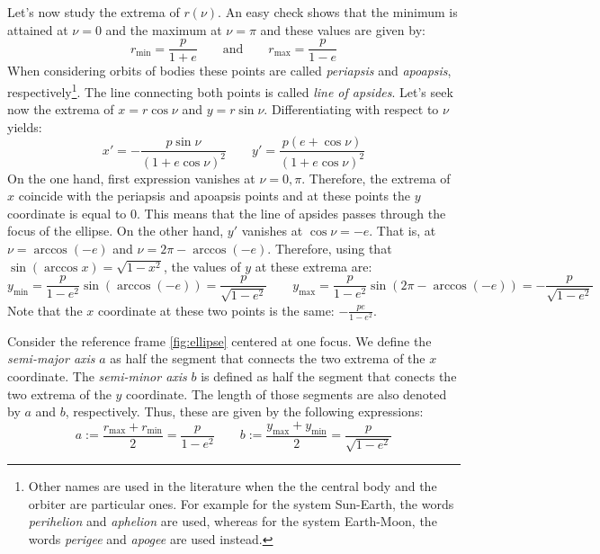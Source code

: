 \documentclass[../main.tex]{subfiles}
\begin{document}
Let's now study the extrema of $r(\nu)$. An easy check shows that the minimum is attained at $\nu=0$ and the maximum at $\nu=\pi$ and these values are given by:
\begin{equation}
  r_\mathrm{min}=\frac{p}{1+e}\qquad\text{and}\qquad r_\mathrm{max}=\frac{p}{1-e}
\end{equation}
When considering orbits of bodies these points are called \emph{periapsis} and \emph{apoapsis}, respectively\footnote{Other names are used in the literature when the the central body and the orbiter are particular ones. For example for the system Sun-Earth, the words \emph{perihelion} and \emph{aphelion} are used, whereas for the system Earth-Moon, the words \emph{perigee} and \emph{apogee} are used instead.}. The line connecting both points is called \emph{line of apsides}. Let's seek now the extrema of $x = r\cos\nu$ and $y = r\sin\nu$. Differentiating with respect to $\nu$ yields:
\begin{equation}
  x'=-\frac{p\sin\nu}{{(1+e\cos\nu)}^2}\qquad y'=\frac{p(e+\cos\nu)}{{(1+e\cos\nu)}^2}
\end{equation}
On the one hand, first expression vanishes at $\nu=0,\pi$. Therefore, the extrema of $x$ coincide with the periapsis and apoapsis points and at these points the $y$ coordinate is equal to 0. This means that the line of apsides passes through the focus of the ellipse. On the other hand, $y'$ vanishes at $\cos\nu=-e$. That is, at $\nu=\arccos (-e)$ and $\nu=2\pi-\arccos(-e)$. Therefore, using that $\sin(\arccos x)=\sqrt{1-x^2}$, the values of $y$ at these extrema are:
\begin{equation}
  y_\mathrm{min}=\frac{p}{1-e^2}\sin(\arccos(-e))=\frac{p}{\sqrt{1-e^2}}\qquad y_\mathrm{max}=\frac{p}{1-e^2}\sin(2\pi-\arccos(-e))=-\frac{p}{\sqrt{1-e^2}}
\end{equation}
Note that the $x$ coordinate at these two points is the same: $-\frac{pe}{1-e^2}$.
\begin{definition}
  Consider the reference frame \cref{fig:ellipse} centered at one focus. We define the \emph{semi-major axis} $a$ as half the segment that connects the two extrema of the $x$ coordinate. The \emph{semi-minor axis} $b$ is defined as half the segment that conects the two extrema of the $y$ coordinate. The length of those segments are also denoted by $a$ and $b$, respectively. Thus, these are given by the following expressions:
  \begin{equation}
    a:=\frac{r_\mathrm{max}+r_\mathrm{min}}{2}=\frac{p}{1-e^2}\qquad b:=\frac{y_\mathrm{max}+y_\mathrm{min}}{2}=\frac{p}{\sqrt{1-e^2}}
  \end{equation}
\end{definition}
\end{document}
